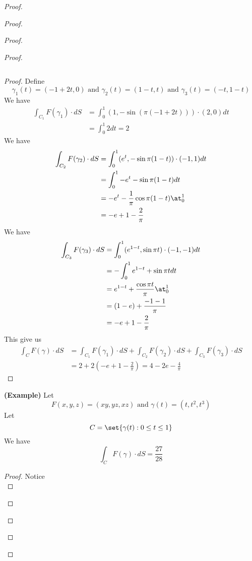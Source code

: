 \documentclass{report}
\begin{document}
\begin{proof}
\begin{proof}
\begin{proof}
\begin{proof}
\begin{theorem}
\begin{equation}
\end{equation}
\end{theorem}
\begin{proof}
Define
\begin{equation}
\gamma_1 (t)=(-1+2t,0)\text{ and }\gamma_2 (t)=(1-t,t)\text{ and }\gamma _3(t)=(-t,1-t)
\end{equation}
We have
\begin{align}
\int_{C_1}F(\gamma _1)\cdot dS&= \int_0^1 (1,- \sin (\pi (-1+2t)))\cdot (2,0) dt\\
&=\int_0^1 2dt=2
\end{align}
We have
\begin{align}
\int_{C_2}F(\gamma _2)\cdot dS&= \int_0^1 (e^t,- \sin \pi (1-t))\cdot (-1,1)dt\\
&=\int_0^1 -e^t- \sin \pi (1-t)dt\\
&=-e^t-\frac{1}{\pi} \cos \pi (1-t)\at_{0}^1\\
&=-e+1-\frac{2}{\pi}
\end{align}
We have
\begin{align}
\int_{C_3} F(\gamma _3)\cdot dS&=\int_0^1 (e^{1-t}, \sin \pi t)\cdot (-1,-1)dt\\
&=-\int_0^1 e^{1-t}+\sin \pi tdt\\
&= e^{1-t}+\frac{\cos \pi t}{\pi }\at_{0}^1\\
&=(1-e)+\frac{-1-1}{\pi}\\
&=-e+1-\frac{2}{\pi}
\end{align}
This give us
\begin{align}
\int_C F(\gamma )\cdot dS&= \int_{C_1}F(\gamma _1)\cdot dS+\int_{C_2}F(\gamma _2)\cdot dS+\int_{C_3}F(\gamma _3)\cdot dS\\
&=2+2(-e+1-\frac{2}{\pi})=4-2e-\frac{4}{\pi}
\end{align}
\end{proof}
\begin{theorem}
\label{9.1.10}
\textbf{(Example)} Let
\begin{equation}
F(x,y,z)=(xy,yz,xz)\text{ and }\gamma (t)=(t,t^2,t^3)
\end{equation}
Let 
\begin{equation}
C=\set{\gamma (t):0\leq t\leq 1}
\end{equation}
We have
\begin{equation}
\int_C F(\gamma )\cdot dS=\frac{27}{28}
\end{equation}
\end{theorem}
\begin{proof}
Notice 
\begin{equation}

\end{equation}
\end{proof}
\end{proof}
\end{proof}
\end{proof}
\end{proof}
\end{document}
